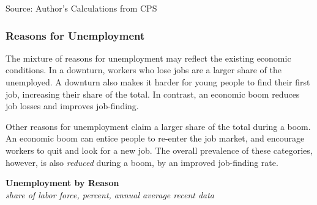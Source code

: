 \documentclass{report}
\newcommand{\tbllink}[1]{\href{https://raw.githubusercontent.com/bdecon/US-chartbook/master/chartbook/data/#1}{\faTable}}
\begin{document}
{\begin{minipage}{1.0\textwidth}
\footnotesize{Source: Author's Calculations from CPS} \hfill \tbllink{unemp_grp.csv}
\end{minipage}
\newpage
\begin{minipage}{1.0\textwidth}  
\subsubsection*{Reasons for Unemployment}
\vspace{-0.5mm}
\small 

The mixture of reasons for unemployment may reflect the existing economic conditions. In a downturn, workers who lose jobs are a larger share of the unemployed. A downturn also makes it harder for young people to find their first job, increasing their share of the total. In contrast, an economic boom reduces job losses and improves job-finding. 

Other reasons for unemployment claim a larger share of the total during a boom. An economic boom can entice people to re-enter the job market, and encourage workers to quit and look for a new job. The overall prevalence of these categories, however, is also \textit{reduced} during a boom, by an improved job-finding rate. 
\vspace{1mm}

\normalsize \textbf{Unemployment by Reason}\\
\footnotesize{\textit{share of labor force, percent, annual average \hspace{36mm} recent data}}
\vspace{3.6cm}


\end{minipage}}
\end{document}
